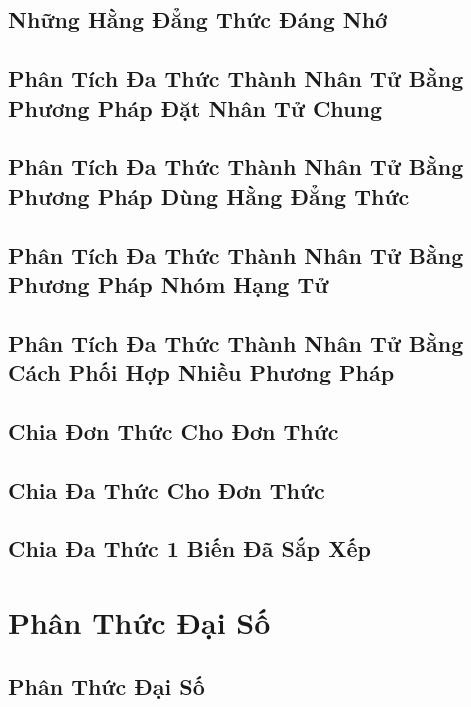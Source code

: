 \documentclass[oneside]{book}
\numberwithin{equation}{section}
\begin{document}
\section{Những Hằng Đẳng Thức Đáng Nhớ}

\section{Phân Tích Đa Thức Thành Nhân Tử Bằng Phương Pháp Đặt Nhân Tử Chung}

\section{Phân Tích Đa Thức Thành Nhân Tử Bằng Phương Pháp Dùng Hằng Đẳng Thức}

\section{Phân Tích Đa Thức Thành Nhân Tử Bằng Phương Pháp Nhóm Hạng Tử}

\section{Phân Tích Đa Thức Thành Nhân Tử Bằng Cách Phối Hợp Nhiều Phương Pháp}

\section{Chia Đơn Thức Cho Đơn Thức}

\section{Chia Đa Thức Cho Đơn Thức}

\section{Chia Đa Thức 1 Biến Đã Sắp Xếp}


\chapter{Phân Thức Đại Số}

\section{Phân Thức Đại Số}
\end{document}

